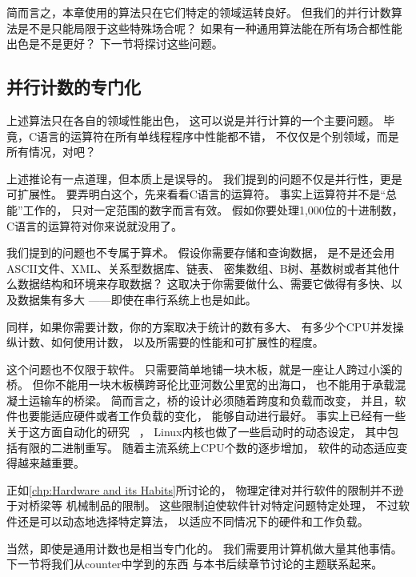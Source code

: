 简而言之，本章使用的算法只在它们特定的领域运转良好。
但我们的并行计数算法是不是只能局限于这些特殊场合呢？
如果有一种通用算法能在所有场合都性能出色是不是更好？
下一节将探讨这些问题。

\subsection{并行计数的专门化}
\label{sec:count:Parallel Counting Specializations}

上述算法只在各自的领域性能出色，
这可以说是并行计算的一个主要问题。
毕竟，C语言的\co{++}运算符在所有单线程程序中性能都不错，
不仅仅是个别领域，而是所有情况，对吧？

上述推论有一点道理，但本质上是误导的。
我们提到的问题不仅是并行性，更是可扩展性。
要弄明白这个，先来看看C语言的\co{++}运算符。
事实上\co{++}运算符并不是``总能''工作的，
只对一定范围的数字而言有效。
假如你要处理1,000位的十进制数，
C语言的\co{++}运算符对你来说就没用了。

\QuickQuizEnd

我们提到的问题也不专属于算术。
假设你需要存储和查询数据，
是不是还会用ASCII文件、XML、关系型数据库、链表、
密集数组、B树、基数树或者其他什么数据结构和环境来存取数据？
这取决于你需要做什么、需要它做得有多快、以及数据集有多大
——即使在串行系统上也是如此。

同样，如果你需要计数，你的方案取决于统计的数有多大、
有多少个CPU并发操纵计数、如何使用计数，
以及所需要的性能和可扩展性的程度。

这个问题也不仅限于软件。
只需要简单地铺一块木板，就是一座让人跨过小溪的桥。
但你不能用一块木板横跨哥伦比亚河数公里宽的出海口，
也不能用于承载混凝土运输车的桥梁。
简而言之，桥的设计必须随着跨度和负载而改变，
并且，软件也要能适应硬件或者工作负载的变化，
能够自动进行最好。
事实上已经有一些关于这方面自动化的研究
~\cite{Appavoo03a,Soules03a}，
Linux内核也做了一些启动时的动态设定，
其中包括有限的二进制重写。
随着主流系统上CPU个数的逐步增加，
软件的动态适应变得越来越重要。

正如\cref{chp:Hardware and its Habits}所讨论的，
物理定律对并行软件的限制并不逊于对桥梁等
机械制品的限制。
这些限制迫使软件针对特定问题特定处理，
不过软件还是可以动态地选择特定算法，
以适应不同情况下的硬件和工作负载。

当然，即使是通用计数也是相当专门化的。
我们需要用计算机做大量其他事情。
下一节将我们从counter中学到的东西
与本书后续章节讨论的主题联系起来。

